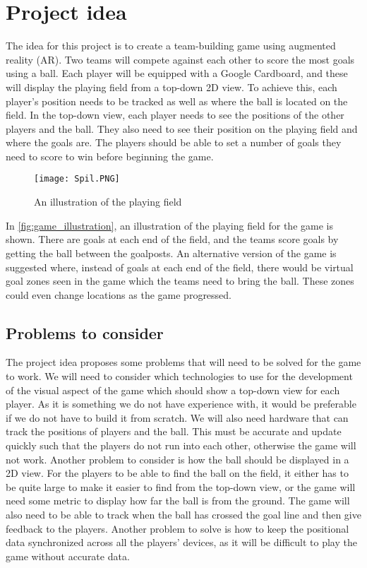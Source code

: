 \section{Project idea}
The idea for this project is to create a team-building game using augmented reality (AR).
Two teams will compete against each other to score the most goals using a ball. 
Each player will be equipped with a Google Cardboard, and these will display the playing field from a top-down 2D view. 
To achieve this, each player's position needs to be tracked as well as where the ball is located on the field.
In the top-down view, each player needs to see the positions of the other players and the ball.
They also need to see their position on the playing field and where the goals are.
The players should be able to set a number of goals they need to score to win before beginning the game. 
\begin{figure}[H]
    \centering
    \texttt{[image: Spil.PNG]}
    \caption{An illustration of the playing field}
    \label{fig:game_illustration}
\end{figure}
In \autoref{fig:game_illustration}, an illustration of the playing field for the game is shown.
There are goals at each end of the field, and the teams score goals by getting the ball between the goalposts.
An alternative version of the game is suggested where, instead of goals at each end of the field, there would be virtual goal zones seen in the game which the teams need to bring the ball.
These zones could even change locations as the game progressed.
\subsection{Problems to consider}
The project idea proposes some problems that will need to be solved for the game to work.
We will need to consider which technologies to use for the development of the visual aspect of the game which should show a top-down view for each player. 
As it is something we do not have experience with, it would be preferable if we do not have to build it from scratch.
We will also need hardware that can track the positions of players and the ball.
This must be accurate and update quickly such that the players do not run into each other, otherwise the game will not work.
Another problem to consider is how the ball should be displayed in a 2D view.
For the players to be able to find the ball on the field, it either has to be quite large to make it easier to find from the top-down view, or the game will need some metric to display how far the ball is from the ground.
The game will also need to be able to track when the ball has crossed the goal line and then give feedback to the players.
Another problem to solve is how to keep the positional data synchronized across all the players' devices, as it will be difficult to play the game without accurate data.
